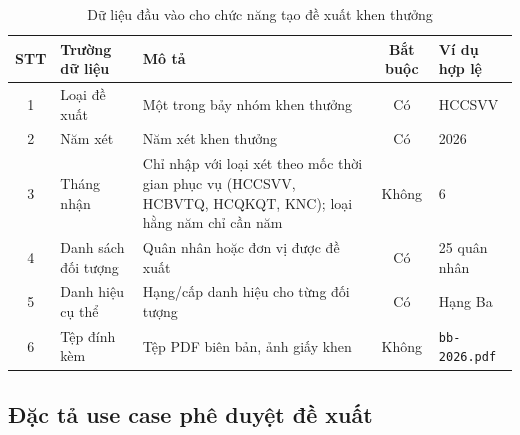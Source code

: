 \documentclass[../DoAn.tex]{subfiles}
\begin{document}
\begin{table}[H]
\centering
\caption{Dữ liệu đầu vào cho chức năng tạo đề xuất khen thưởng}
\label{tab:uc03-input}
\begin{tabular}{|c|p{3.2cm}|p{4.3cm}|c|p{2.5cm}|}
\hline
\textbf{STT} & \textbf{Trường dữ liệu} & \textbf{Mô tả} & \textbf{Bắt buộc} & \textbf{Ví dụ hợp lệ} \\ \hline
1 & Loại đề xuất & Một trong bảy nhóm khen thưởng & Có & HCCSVV \\ \hline
2 & Năm xét & Năm xét khen thưởng & Có & 2026 \\ \hline
3 & Tháng nhận & Chỉ nhập với loại xét theo mốc thời gian phục vụ (HCCSVV, HCBVTQ, HCQKQT, KNC); loại hằng năm chỉ cần năm & Không & 6 \\ \hline
4 & Danh sách đối tượng & Quân nhân hoặc đơn vị được đề xuất & Có & 25 quân nhân \\ \hline
5 & Danh hiệu cụ thể & Hạng/cấp danh hiệu cho từng đối tượng & Có & Hạng Ba \\ \hline
6 & Tệp đính kèm & Tệp PDF biên bản, ảnh giấy khen & Không & \texttt{bb-2026.pdf} \\ \hline
\end{tabular}
\end{table}

\subsection{Đặc tả use case phê duyệt đề xuất}
\end{document}
